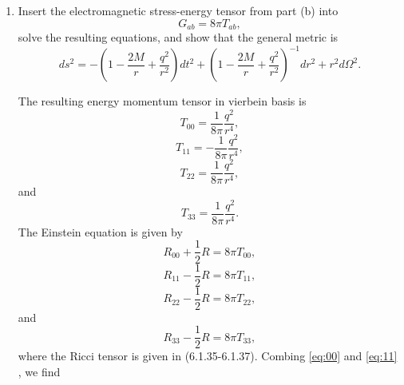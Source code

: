 \begin{enumerate}[label=\alph*)]
\begin{solution}
    \end{solution}

    \item Insert the electromagnetic stress-energy tensor from part (b) into
    \begin{equation}
        G_{ab}=8\pi T_{ab},
    \end{equation}
    solve the resulting equations, and show that the general metric is
    \begin{equation}
        ds^2
        =-\left(1-\frac{2M}{r}+\frac{q^2}{r^2}\right)dt^2
        +\left(1-\frac{2M}{r}+\frac{q^2}{r^2}\right)^{-1}dr^2
        +r^2d\Omega^2.
    \end{equation}
    \begin{solution}
        The resulting energy momentum tensor in vierbein basis is
        \begin{equation}
            T_{00} = \frac{1}{8\pi}\frac{q^2}{r^4},
        \end{equation}
        \begin{equation}
            T_{11} = -\frac{1}{8\pi}\frac{q^2}{r^4},
        \end{equation}
        \begin{equation}
            T_{22} = \frac{1}{8\pi}\frac{q^2}{r^4},
        \end{equation}
        and
        \begin{equation}
            T_{33} = \frac{1}{8\pi}\frac{q^2}{r^4}.
        \end{equation}
        The Einstein equation is given by
        \begin{equation}
            R_{00} +\frac{1}{2}R = 8\pi T_{00},
            \label{eq:00}
        \end{equation}
        \begin{equation}
            R_{11} - \frac{1}{2}R = 8\pi T_{11},
            \label{eq:11}
        \end{equation}
        \begin{equation}
            R_{22} - \frac{1}{2}R = 8\pi  T_{22},
            \label{eq:22}
        \end{equation}
        and
        \begin{equation}
            R_{33} - \frac{1}{2}R = 8\pi T_{33},
            \label{eq:33}
        \end{equation}
        where the Ricci tensor is given in (6.1.35-6.1.37).
        Combing \eqref{eq:00} and \eqref{eq:11} , we find
        \begin{equation}

\end{equation}
\end{solution}
\end{enumerate}
